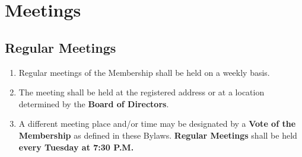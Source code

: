 \documentclass{article}
\begin{document}
\section{Meetings}
\subsection{Regular Meetings}
\begin{enumerate}
    \item Regular meetings of the Membership shall be held on a weekly basis.
    \item The meeting shall be held at the registered address or at a location determined by the \textbf{Board of Directors}.
    \item A different meeting place and/or time may be designated by a \textbf{Vote of the Membership} as defined in these Bylaws. \textbf{Regular Meetings} shall be held \textbf{every Tuesday at 7:30 P.M.}
\end{enumerate}
\end{document}
